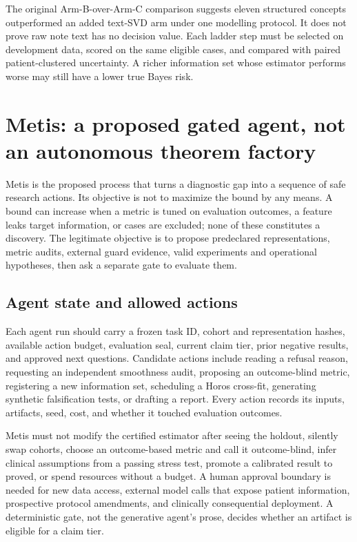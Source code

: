 \documentclass[11pt]{article}
\newcommand{\tier}[1]{\textsf{#1}}
\begin{document}
The original Arm-B-over-Arm-C comparison suggests eleven structured concepts outperformed an added text-SVD arm under one modelling protocol. It does not prove raw note text has no decision value. Each ladder step must be selected on development data, scored on the same eligible cases, and compared with paired patient-clustered uncertainty. A richer information set whose estimator performs worse may still have a lower true Bayes risk.

\section{Metis: a proposed gated agent, not an autonomous theorem factory}
Metis is the proposed process that turns a diagnostic gap into a sequence of safe research actions. Its objective is not to maximize the bound by any means. A bound can increase when a metric is tuned on evaluation outcomes, a feature leaks target information, or cases are excluded; none of these constitutes a discovery. The legitimate objective is to propose predeclared representations, metric audits, external guard evidence, valid experiments and operational hypotheses, then ask a separate gate to evaluate them.

\subsection{Agent state and allowed actions}
Each agent run should carry a frozen task ID, cohort and representation hashes, available action budget, evaluation seal, current claim tier, prior negative results, and approved next questions. Candidate actions include reading a refusal reason, requesting an independent smoothness audit, proposing an outcome-blind metric, registering a new information set, scheduling a Horos cross-fit, generating synthetic falsification tests, or drafting a report. Every action records its inputs, artifacts, seed, cost, and whether it touched evaluation outcomes.

Metis must not modify the certified estimator after seeing the holdout, silently swap cohorts, choose an outcome-based metric and call it outcome-blind, infer clinical assumptions from a passing stress test, promote a \tier{calibrated} result to \tier{proved}, or spend resources without a budget. A human approval boundary is needed for new data access, external model calls that expose patient information, prospective protocol amendments, and clinically consequential deployment. A deterministic gate, not the generative agent's prose, decides whether an artifact is eligible for a claim tier.
\end{document}
